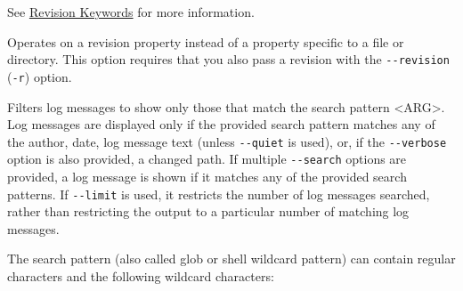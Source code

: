 \begin{description}
See \hyperref[svn.tour.revs.keywords]{Revision Keywords} for more
information.
\item[\protect\phantomsection\label{svn.ref.svn.sw.revprop}{}\texttt{-\/-revprop}]
Operates on a revision property instead of a property specific to a file
or directory. This option requires that you also pass a revision with
the \texttt{-\/-revision} (\texttt{-r}) option.
\item[\protect\phantomsection\label{svn.ref.svn.sw.search}{}\texttt{-\/-search}
\textless ARG\textgreater{}]
Filters log messages to show only those that match the search pattern
\textless ARG\textgreater. Log messages are displayed only if the
provided search pattern matches any of the author, date, log message
text (unless \texttt{-\/-quiet} is used), or, if the
\texttt{-\/-verbose} option is also provided, a changed path. If
multiple \texttt{-\/-search} options are provided, a log message is
shown if it matches any of the provided search patterns. If
\texttt{-\/-limit} is used, it restricts the number of log messages
searched, rather than restricting the output to a particular number of
matching log messages.

The search pattern (also called glob or shell wildcard pattern) can
contain regular characters and the following wildcard characters:


\end{description}
